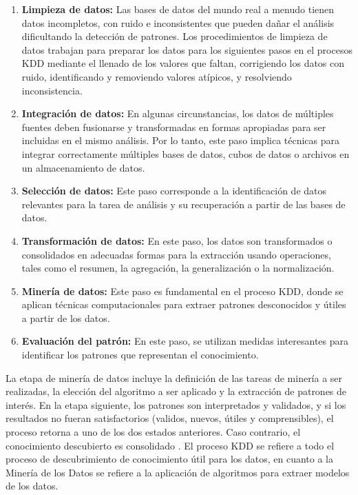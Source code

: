 \begin{enumerate}

    \item \textbf{Limpieza de datos:} Las bases de datos del mundo real a menudo tienen datos incompletos, con ruido e inconsistentes que pueden dañar el análisis dificultando la detección de patrones. Los procedimientos de limpieza de datos trabajan para preparar los datos para los siguientes pasos en el procesos KDD mediante el llenado de los valores que faltan, corrigiendo los datos con ruido, identificando y removiendo valores atípicos, y resolviendo inconsistencia.
    \item \textbf{Integración de datos:} En algunas circunstancias, los datos de múltiples fuentes deben fusionarse y transformadas en formas apropiadas para ser incluidas en el mismo análisis. Por lo tanto, este paso implica técnicas para integrar correctamente múltiples bases de datos, cubos de datos o archivos en un almacenamiento de datos.
    \item \textbf{Selección de datos:} Este paso corresponde a la identificación de datos relevantes para la tarea de análisis y su recuperación a partir de las bases de datos.
    \item \textbf{Transformación de datos:} En este paso, los datos son transformados o consolidados en adecuadas formas para la extracción usando operaciones, tales como el resumen, la agregación, la generalización o la normalización.
    \item \textbf{Minería de datos:} Este paso es fundamental en el proceso KDD, donde se aplican técnicas computacionales para extraer patrones desconocidos y útiles a partir de los datos.
    \item \textbf{Evaluación del patrón:} En este paso, se utilizan medidas interesantes para identificar los patrones que representan el conocimiento.

\end{enumerate}


La etapa de minería de datos incluye la definición de las tareas de minería a ser realizadas, la elección del algoritmo a ser aplicado y la extracción de patrones de interés. En la etapa siguiente, los patrones son interpretados y validados, y si los resultados no fueran satisfactorios (validos, nuevos, útiles y comprensibles), el proceso retorna a uno de los dos estados anteriores. Caso contrario, el conocimiento descubierto es consolidado \cite{Fayyad:1996:DMK:257938.257942}. El proceso KDD se refiere a todo el proceso de descubrimiento de conocimiento útil para los datos, en cuanto a la Minería de los Datos se refiere a la aplicación de algoritmos para extraer modelos de los datos.


